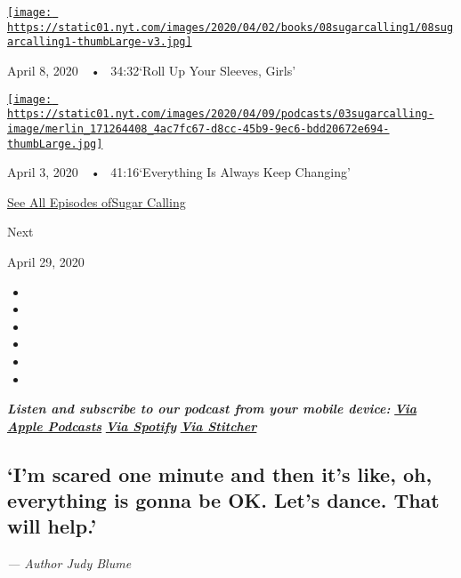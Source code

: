 \href{https://www.nytimes.com/2020/04/08/podcasts/sugar-calling-margaret-atwood-coronavirus.html?action=click\&module=audio-series-bar\&region=header\&pgtype=Article}{\texttt{[image: https://static01.nyt.com/images/2020/04/02/books/08sugarcalling1/08sugarcalling1-thumbLarge-v3.jpg]}}

April 8, 2020~~•~ 34:32`Roll Up Your Sleeves, Girls'

\href{https://www.nytimes.com/2020/04/03/podcasts/sugar-calling-george-saunders-coronavirus.html?action=click\&module=audio-series-bar\&region=header\&pgtype=Article}{\texttt{[image: https://static01.nyt.com/images/2020/04/09/podcasts/03sugarcalling-image/merlin\_171264408\_4ac7fc67-d8cc-45b9-9ec6-bdd20672e694-thumbLarge.jpg]}}

April 3, 2020~~•~ 41:16`Everything Is Always Keep Changing'

\href{https://www.nytimes.com/column/sugar-calling}{See All Episodes
ofSugar Calling}

Next

April 29, 2020

\begin{itemize}
\item
\item
\item
\item
\item
\item
\end{itemize}

\emph{\textbf{Listen and subscribe to our podcast from your mobile
device:}}
\textbf{\href{https://podcasts.apple.com/us/podcast/sugar-calling/id1505881384}{\emph{Via
Apple Podcasts}}} \emph{\textbf{\textbar{}}}
\textbf{\href{https://open.spotify.com/show/4U8hPiNGIBvTS9zLeiDCN7?si=gRyigD47SPWl-QWgNjgt2w}{\emph{Via
Spotify}}} \emph{\textbf{\textbar{}}}
\textbf{\href{https://www.stitcher.com/podcast/the-new-york-times/sugar-calling}{\emph{Via
Stitcher}}}

\hypertarget{im-scared-one-minute-and-then-its-like-oh-everything-is-gonna-be-ok-lets-dance-that-will-help}{%
\subsection{`I'm scared one minute and then it's like, oh, everything is
gonna be OK. Let's dance. That will
help.'}\label{im-scared-one-minute-and-then-its-like-oh-everything-is-gonna-be-ok-lets-dance-that-will-help}}

\emph{--- Author Judy Blume}

